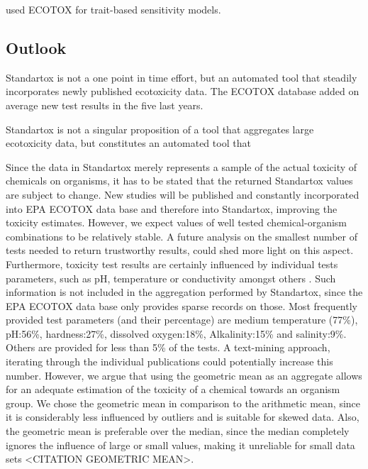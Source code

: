 \citet{vandenberg_modeling_2019} used ECOTOX for trait-based sensitivity models. 


\subsection{Outlook}
Standartox is not a one point in time effort, but an automated tool that steadily incorporates newly published ecotoxicity data. The ECOTOX database added on average  new test results in the five last years.

Standartox is not a singular proposition of a tool that aggregates large ecotoxicity data, but constitutes an automated tool that 



Since the data in Standartox merely represents a sample of the actual toxicity of chemicals on organisms, it has to be stated that the returned Standartox values are subject to change. New studies will be published and constantly incorporated into EPA ECOTOX data base and therefore into Standartox, improving the toxicity estimates. However, we expect values of well tested chemical-organism combinations to be relatively stable. A future analysis on the smallest number of tests needed to return trustworthy results, could shed more light on this aspect. Furthermore, toxicity test results are certainly influenced by individual tests parameters, such as pH, temperature or conductivity amongst others \citep{rosenkrantz_influence_2013, li_temperature_2011}. Such information is not included in the aggregation performed by Standartox, since the EPA ECOTOX data base only provides sparse records on those. Most frequently provided test parameters (and their percentage) are medium temperature (77\%), pH:56\%, hardness:27\%, dissolved oxygen:18\%, Alkalinity:15\% and salinity:9\%. Others are provided for less than 5\% of the tests. A text-mining approach, iterating through the individual publications could potentially increase this number. However, we argue that using the geometric mean as an aggregate allows for an adequate estimation of the toxicity of a chemical towards an organism group. We chose the geometric mean in comparison to the arithmetic mean, since it is considerably less influenced by outliers and is suitable for skewed data. Also, the geometric mean is preferable over the median, since the median completely ignores the influence of large or small values, making it unreliable for small data sets <CITATION GEOMETRIC MEAN>.


